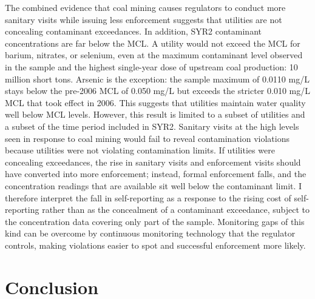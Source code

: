 \documentclass[12pt]{article}
\begin{document}

The combined evidence that coal mining causes regulators to conduct more sanitary visits while issuing less enforcement suggests that utilities are not concealing contaminant exceedances. In addition, SYR2 contaminant concentrations are far below the MCL. A utility would not exceed the MCL for barium, nitrates, or selenium, even at the maximum contaminant level observed in the sample and the highest single-year dose of upstream coal production: 10 million short tons. Arsenic is the exception: the sample maximum of 0.0110 mg/L stays below the pre-2006 MCL of 0.050 mg/L but exceeds the stricter 0.010 mg/L MCL that took effect in 2006. This suggests that utilities maintain water quality well below MCL levels. However, this result is limited to a subset of utilities and a subset of the time period included in SYR2. Sanitary visits at the high levels seen in response to coal mining would fail to reveal contamination violations because utilities were not violating contamination limits. If utilities were concealing exceedances, the rise in sanitary visits and enforcement visits should have converted into more enforcement; instead, formal enforcement falls, and the concentration readings that are available sit well below the contaminant limit. I therefore interpret the fall in self-reporting as a response to the rising cost of self-reporting rather than as the concealment of a contaminant exceedance, subject to the concentration data covering only part of the sample. Monitoring gaps of this kind can be overcome by continuous monitoring technology that the regulator controls, making violations easier to spot and successful enforcement more likely.

\section{Conclusion}\label{sec:conclusion}
\end{document}
